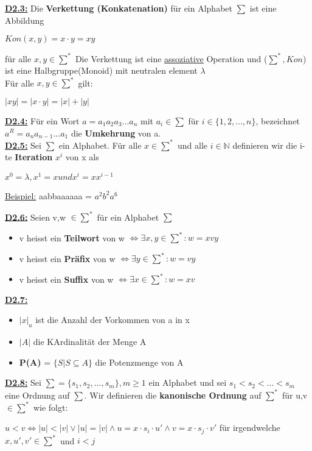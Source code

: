 \documentclass[8pt]{extreport}
\begin{document}
\underline{\textbf{D2.3:}} Die \textbf{Verkettung (Konkatenation)} für ein Alphabet $\sum$ ist eine Abbildung 
\begin{center}
$Kon(x,y) = x \cdot y = xy$
\end{center}
für alle $x,y \in \sum^{*}$
Die Verkettung ist eine \underline{assoziative} Operation und ($\sum^*,Kon$) ist eine Halbgruppe(Monoid) mit neutralen element $\lambda$\\
Für alle $x,y \in \sum^{*}$ gilt:
\begin{center}
$|xy| = |x \cdot y | = |x| + |y|$
\end{center}
\underline{\textbf{D2.4:}} Für ein Wort $a=a_1a_2a_3...a_n$ mit $a_i \in \sum$ für $i \in \{1,2,...,n\}$, bezeichnet $a^{R} = a_na_{n-1}...a_1$ die \textbf{Umkehrung} von a.\\
\underline{\textbf{D2.5:}} Sei $\sum$ ein Alphabet. Für alle $x \in \sum^{*}$ und alle $i \in \mathbb{N}$ definieren wir die i-te \textbf{Iteration} $x^i$ von x als
\begin{center}
$x^0 = \lambda, x^1 = x und x^i = xx^{i-1}$
\end{center}
\underline{Beispiel:} aabbaaaaaa = $a^2b^2a^6$

\underline{\textbf{D2.6:}} Seien v,w $\in \sum^*$ für ein Alphabet $\sum$
\begin{itemize}
\item v heisst ein \textbf{Teilwort} von w $\iff \exists x,y \in \sum^*: w = xvy$
\item v heisst ein \textbf{Präfix} von w $\iff \exists y \in \sum^*: w = vy$
\item v heisst ein \textbf{Suffix} von w $\iff \exists x \in \sum^*: w = xv$
\end{itemize}


\underline{\textbf{D2.7:}}
\begin{itemize}
\item $|x|_a$ ist die Anzahl der Vorkommen von a in x
\item $|A|$ die KArdinalität der Menge A
\item \textbf{P(A)} = $\{S|S\subseteq A\}$ die Potenzmenge von A
\end{itemize}


\underline{\textbf{D2.8:}} Sei $\sum = \{s_1,s_2,...,s_m\}, m\geq 1$ ein Alphabet und sei $s_1<s_2<...<s_m$ eine Ordnung auf $\sum$. Wir definieren die \textbf{kanonische Ordnung} auf $\sum^*$ für u,v $\in \sum^*$ wie folgt:

\begin{center}
$u<v \iff |u|<|v| \lor  |u|=|v| \land u = x \cdot s_i \cdot u' \land v = x \cdot s_j \cdot v'$ für irgendwelche $x,u',v' \in \sum^*$ und $i<j$ 

\end{center}
\end{document}
